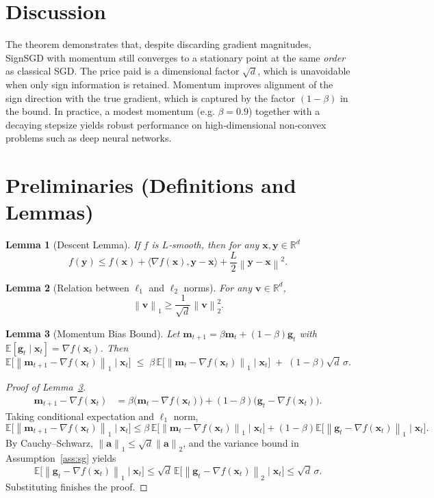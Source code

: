 \documentclass[11pt]{article}
\newtheorem{lemma}{Lemma}
\newcommand{\E}{\mathbb{E}}
\newcommand{\R}{\mathbb{R}}
\newcommand{\norm}[1]{\left\lVert#1\right\rVert}
\newcommand{\ip}[2]{\langle #1,#2\rangle}
\begin{document}
\section*{Discussion}
The theorem demonstrates that, despite discarding gradient magnitudes, SignSGD with momentum still converges to a stationary point at the same \emph{order} as classical SGD. The price paid is a dimensional factor $\sqrt{d}$, which is unavoidable when only sign information is retained. Momentum improves alignment of the sign direction with the true gradient, which is captured by the factor $(1-\beta)$ in the bound. In practice, a modest momentum (e.g. $\beta=0.9$) together with a decaying stepsize yields robust performance on high‑dimensional non‑convex problems such as deep neural networks.

\newpage
\section*{Preliminaries (Definitions and Lemmas)}
\begin{lemma}[Descent Lemma]\label{lem:descent}
If $f$ is $L$‑smooth, then for any $\bm{x},\bm{y}\in\R^{d}$
\[
f(\bm{y})\le f(\bm{x})+\ip{\nabla f(\bm{x})}{\bm{y}-\bm{x}}+\frac{L}{2}\norm{\bm{y}-\bm{x}}^{2}.
\]
\end{lemma}
\begin{lemma}[Relation between $\ell_{1}$ and $\ell_{2}$ norms]\label{lem:l1l2}
For any $\bm{v}\in\R^{d}$,
\[
\norm{\bm{v}}_{1}\ge\frac{1}{\sqrt{d}}\norm{\bm{v}}_{2}^{2}.
\]
\end{lemma}
\begin{lemma}[Momentum Bias Bound]\label{lem:momentum}
Let $\bm{m}_{t+1}= \beta\bm{m}_{t}+(1-\beta)\bm{g}_{t}$ with $\E[\bm{g}_{t}\mid\bm{x}_{t}]=\nabla f(\bm{x}_{t})$. Then
\[
\E\big[\norm{\bm{m}_{t+1}-\nabla f(\bm{x}_{t})}_{1}\mid\bm{x}_{t}\big]
\;\le\;
\beta\,\E\big[\norm{\bm{m}_{t}-\nabla f(\bm{x}_{t})}_{1}\mid\bm{x}_{t}\big]
\;+\;(1-\beta)\sqrt{d}\,\sigma .
\]
\end{lemma}
\begin{proof}[Proof of Lemma~\ref{lem:momentum}]
\begin{align*}
\bm{m}_{t+1}-\nabla f(\bm{x}_{t})
&= \beta\big(\bm{m}_{t}-\nabla f(\bm{x}_{t})\big)+(1-\beta)\big(\bm{g}_{t}-\nabla f(\bm{x}_{t})\big).
\end{align*}
Taking conditional expectation and $\ell_{1}$ norm,
\[
\E\big[\norm{\bm{m}_{t+1}-\nabla f(\bm{x}_{t})}_{1}\mid\bm{x}_{t}\big]
\le\beta\,\E\big[\norm{\bm{m}_{t}-\nabla f(\bm{x}_{t})}_{1}\mid\bm{x}_{t}\big]
+(1-\beta)\E\big[\norm{\bm{g}_{t}-\nabla f(\bm{x}_{t})}_{1}\mid\bm{x}_{t}\big].
\]
By Cauchy–Schwarz, $\norm{\bm{a}}_{1}\le\sqrt{d}\norm{\bm{a}}_{2}$, and the variance bound in Assumption~\ref{ass:sg} yields
\[
\E\big[\norm{\bm{g}_{t}-\nabla f(\bm{x}_{t})}_{1}\mid\bm{x}_{t}\big]
\le\sqrt{d}\,\E\big[\norm{\bm{g}_{t}-\nabla f(\bm{x}_{t})}_{2}\mid\bm{x}_{t}\big]
\le\sqrt{d}\,\sigma .
\]
Substituting finishes the proof. \hfill\qedsymbol
\end{proof}
\end{document}
